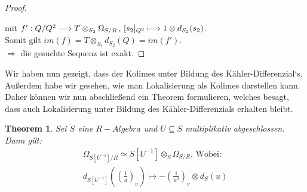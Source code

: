 \documentclass[10pt,a4paper]{report}
\newcommand{\comment}[1]{}
\newcounter{Aussage}[chapter]
\newtheorem{theorem}[Aussage]{Theorem}
\newcommand{\function}[5]{\nolinebreak{#1:#2 \longrightarrow #3 \, , \, #4 \longmapsto #5}}
\newcommand{\divR}[2]{\Omega_{#1/#2}}
\newcommand{\divf}[1]{d_{#1}}
\newcommand{\Tensor}[3]{#1 \otimes_{#2} #3}
\newcommand{\tensor}[3]{#1 \otimes #3}
\newcommand{\lok}[2]{#1 [#2^{-1}]}
\newcommand{\loke}[3]{(\frac{#1}{#2})_{_{#3}}}
\newcommand{\immage}[1]{im(#1)}
\begin{document}
\begin{proof}
\begin{center}
\end{center}
mit $\function{f'}{Q/Q^2}{{\Tensor{T}{S_2}{\divR{S}{R}}}}{[s_2]_{Q^2}}{\tensor{1}{S_2}{\divf{S_2}(s_2)}}$.\\
Somit gilt $\immage{f} = \Tensor{T}{S_2}{\divf{S_2}(Q)} = \immage{f'}$.\\
$\Rightarrow$ die gesuchte Sequenz ist exakt.
\end{proof}


Wir haben nun gezeigt, dass der Kolimes unter Bildung des Kähler-Differenzial`s. Außerdem habe wir gesehen, wie man Lokalisierung als Kolimes darstellen kann. Daher können wir nun abschließend ein Theorem formulieren, welches besagt, dass auch Lokalisierung unter Bildung des Kähler-Differenzials erhalten bleibt.
\begin{theorem}\comment{\label{Lokalisierung des Kähler-Differenzials}}
Sei $S$ eine $R-Algebra$ und $U \subseteq S$ multiplikativ abgeschlossen.
Dann gilt:
\begin{gather*}
\divR{\lok{S}{U}}{R} \simeq \Tensor{\lok{S}{U}}{S}{\divR{S}{R}} \text{, Wobei:}\\
 \divf{\lok{S}{U}}(\loke{1}{u}{U}) \longmapsto -\tensor{\loke{1}{u^2}{U}}{S}{\divf{S}(u)}
\end{gather*}
\end{theorem}
\end{document}
